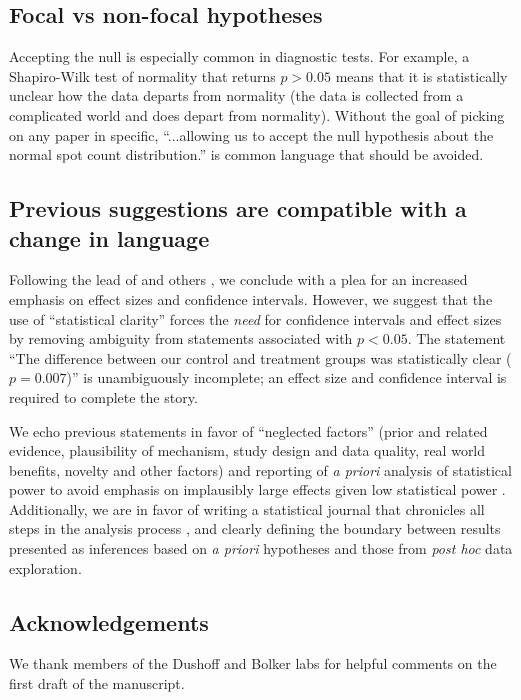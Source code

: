 \subsection*{Focal vs non-focal hypotheses}

Accepting the null is especially common in diagnostic tests. For example, a Shapiro-Wilk test of normality that returns $p > 0.05$ means that it is statistically unclear how the data departs from normality (the data is collected from a complicated world and does depart from normality). Without the goal of picking on any paper in specific, ``...allowing us to accept the null hypothesis about the normal spot count distribution.'' \citep{Karulinetal.2015} is common language that should be avoided.

\subsection*{Previous suggestions are compatible with a change in language}

Following the lead of \citet{Cohen1994} and others \citep{Goodman1999, ZiliakandMcCloskey2008, WassersteinandLazar2016}, we conclude with a plea for an increased emphasis on effect sizes and confidence intervals. However, we suggest that the use of ``statistical clarity'' forces the \emph{need} for confidence intervals and effect sizes by removing ambiguity from statements associated with $p < 0.05$. The statement ``The difference between our control and treatment groups was statistically clear ($p = 0.007$)'' is unambiguously incomplete; an effect size and confidence interval is required to complete the story.

We echo previous statements in favor of ``neglected factors'' (prior and related evidence, plausibility of mechanism, study design and data quality, real world benefits, novelty and other factors) \citep{McShaneetal.2017} and reporting of \emph{a priori} analysis of statistical power to avoid emphasis on implausibly large effects given low statistical power \citep[the "winners curse"][]{GelmanandCarlin2014, SzucsandIoannidis2017, Bernardietal.2017}.  Additionally, we are in favor of writing a statistical journal that chronicles all steps in the analysis process \citep{Kassetal.2016}, and clearly defining the boundary between results presented as inferences based on \emph{a priori} hypotheses and those from \emph{post hoc} data exploration.

\subsection*{Acknowledgements}

We thank members of the Dushoff and Bolker labs for helpful comments on the first draft of the manuscript.


